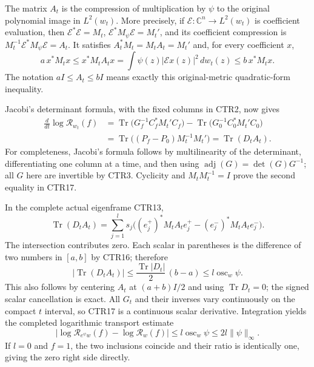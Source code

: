 \documentclass[11pt,a4paper]{article}
\begin{document}
The matrix $A_t$ is the compression of multiplication by $\psi$ to
the original polynomial image in $L^2(w_t)$. More precisely, if
$\mathcal E:\mathbb C^n\to L^2(w_t)$ is coefficient evaluation, then
$\mathcal E^*\mathcal E=M_t$,
$\mathcal E^*M_\psi\mathcal E=M_t'$, and its coefficient compression is
$M_t^{-1}\mathcal E^*M_\psi\mathcal E=A_t$.
It satisfies $A_t^*M_t=M_tA_t=M_t'$ and, for every coefficient $x$,
\[
 a\,x^*M_tx\leq x^*M_tA_tx
   =\int\psi(z)|\mathcal Ex(z)|^2\,dw_t(z)
 \leq b\,x^*M_tx.
 \tag{CTR16}
\]
The notation $aI\leq A_t\leq bI$ means exactly this original-metric
quadratic-form inequality.

Jacobi's determinant formula, with the fixed columns in CTR2, now gives
\[
 \begin{split}
 \frac{d}{dt}\log\mathcal R_{w_t}(f)
 &=\operatorname{Tr}\bigl(G_f^{-1}C_f^*M_t'C_f\bigr)
   -\operatorname{Tr}\bigl(G_0^{-1}C_0^*M_t'C_0\bigr)\\
 &=\operatorname{Tr}\bigl((P_f-P_0)M_t^{-1}M_t'\bigr)
   =\operatorname{Tr}(D_tA_t).
 \end{split}
 \tag{CTR17}
\]
For completeness, Jacobi's formula follows by multilinearity of the
determinant, differentiating one column at a time, and then using
$\operatorname{adj}(G)=\det(G)G^{-1}$; all $G$ here are invertible by
CTR3. Cyclicity and $M_tM_t^{-1}=I$ prove the second equality in CTR17.

In the complete actual eigenframe CTR13,
\[
 \operatorname{Tr}(D_tA_t)
 =\sum_{j=1}^l s_j
   \bigl((e_j^+)^*M_tA_te_j^+-(e_j^-)^*M_tA_te_j^-\bigr).
 \tag{CTR18}
\]
The intersection contributes zero. Each scalar in parentheses is the
difference of two numbers in $[a,b]$ by CTR16; therefore
\[
 |\operatorname{Tr}(D_tA_t)|
 \leq\frac{\operatorname{Tr}|D_t|}{2}\,(b-a)
 \leq l\operatorname{osc}_w\psi.
 \tag{CTR19}
\]
This also follows by centering $A_t$ at $(a+b)I/2$ and using
$\operatorname{Tr}D_t=0$; the signed scalar cancellation is exact.
All $G_t$ and their inverses vary continuously on the compact $t$
interval, so CTR17 is a continuous scalar derivative. Integration yields
the completed logarithmic transport estimate
\[
 \boxed{
 \left|\log\mathcal R_{e^\psi w}(f)-\log\mathcal R_w(f)\right|
 \leq l\operatorname{osc}_w\psi
 \leq2l\|\psi\|_\infty.}
 \tag{CTR20}
\]
If $l=0$ and $f=1$, the two inclusions coincide and their ratio is
identically one, giving the zero right side directly.
\end{document}
